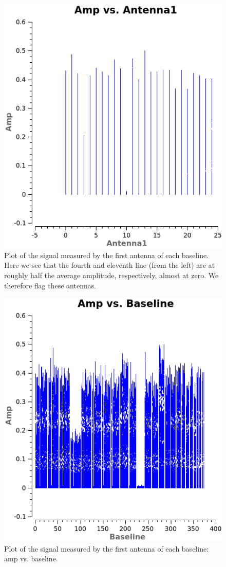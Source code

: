 \documentclass[12pt, a4paper]{article}
\begin{document}
\begin{figure}
    \centering
    \includegraphics[scale=0.7]{../Imaging/plots/amp_vs_antenna1_vraag19.png}
    \caption{Plot of the signal measured by the first antenna of each baseline. Here we see that the fourth and eleventh line (from the left) are at roughly half the average amplitude, respectively, almost at zero. We therefore flag these antennas. \label{fig:19-ant1}}
\end{figure}

\begin{figure}
    \centering
    \includegraphics[scale=0.7]{../Imaging/plots/amp_vs_baseline_vraag19.png}
    \caption{Plot of the signal measured by the first antenna of each baseline: amp vs. baseline. \label{fig:19-baseline}}
\end{figure}
\end{document}
